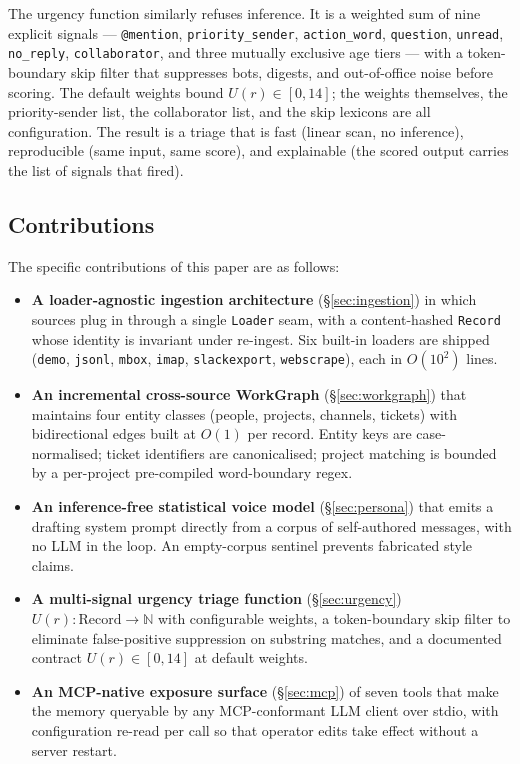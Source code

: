 The urgency function similarly refuses inference. It is a weighted sum of
nine explicit signals --- \texttt{@mention}, \texttt{priority\_sender},
\texttt{action\_word}, \texttt{question}, \texttt{unread}, \texttt{no\_reply},
\texttt{collaborator}, and three mutually exclusive age tiers --- with a
token-boundary skip filter that suppresses bots, digests, and out-of-office
noise before scoring. The default weights bound $U(r) \in [0, 14]$; the weights
themselves, the priority-sender list, the collaborator list, and the skip
lexicons are all configuration. The result is a triage that is fast (linear
scan, no inference), reproducible (same input, same score), and explainable
(the scored output carries the list of signals that fired).

\subsection{Contributions}
The specific contributions of this paper are as follows:
\begin{itemize}
    \item \textbf{A loader-agnostic ingestion architecture}
    (\S\ref{sec:ingestion}) in which sources plug in through a single
    \texttt{Loader} seam, with a content-hashed \texttt{Record} whose
    identity is invariant under re-ingest. Six built-in loaders are shipped
    (\texttt{demo}, \texttt{jsonl}, \texttt{mbox}, \texttt{imap},
    \texttt{slackexport}, \texttt{webscrape}), each in $O(10^{2})$ lines.
    \item \textbf{An incremental cross-source WorkGraph}
    (\S\ref{sec:workgraph}) that maintains four entity classes (people,
    projects, channels, tickets) with bidirectional edges built at $O(1)$
    per record. Entity keys are case-normalised; ticket identifiers are
    canonicalised; project matching is bounded by a per-project pre-compiled
    word-boundary regex.
    \item \textbf{An inference-free statistical voice model}
    (\S\ref{sec:persona}) that emits a drafting system prompt directly from
    a corpus of self-authored messages, with no LLM in the loop. An
    empty-corpus sentinel prevents fabricated style claims.
    \item \textbf{A multi-signal urgency triage function} (\S\ref{sec:urgency})
    $U(r) : \mathrm{Record} \to \mathbb{N}$ with configurable weights, a
    token-boundary skip filter to eliminate false-positive suppression on
    substring matches, and a documented contract $U(r) \in [0, 14]$ at
    default weights.
    \item \textbf{An MCP-native exposure surface} (\S\ref{sec:mcp}) of seven
    tools that make the memory queryable by any MCP-conformant LLM client
    over stdio, with configuration re-read per call so that operator edits
    take effect without a server restart.
\end{itemize}

